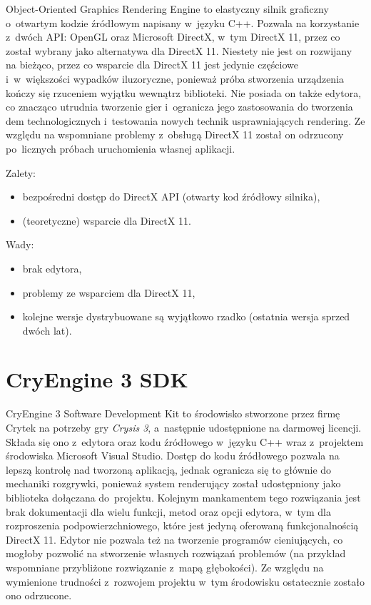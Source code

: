Object-Oriented Graphics Rendering Engine to elastyczny silnik graficzny o~otwartym kodzie źródłowym napisany w~języku C++. Pozwala na korzystanie z~dwóch API: OpenGL oraz Microsoft DirectX, w~tym DirectX 11, przez co został wybrany jako alternatywa dla DirectX 11. Niestety nie jest on rozwijany na bieżąco, przez co wsparcie dla DirectX 11 jest jedynie częściowe i~w~większości wypadków iluzoryczne, ponieważ próba stworzenia urządzenia kończy się rzuceniem wyjątku wewnątrz biblioteki. Nie posiada on także edytora, co znacząco utrudnia tworzenie gier i~ogranicza jego zastosowania do tworzenia dem technologicznych i~testowania nowych technik usprawniających rendering. Ze względu na wspomniane problemy z~obsługą DirectX 11 został on odrzucony po~licznych próbach uruchomienia własnej aplikacji.\\

{\raggedright Zalety:
\begin{itemize}
\item bezpośredni dostęp do DirectX API (otwarty kod źródłowy silnika),
\item (teoretyczne) wsparcie dla DirectX 11.
\end{itemize}

Wady:
\begin{itemize}
\item brak edytora,
\item problemy ze wsparciem dla DirectX 11,
\item kolejne wersje dystrybuowane są wyjątkowo rzadko (ostatnia wersja sprzed dwóch lat).
\end{itemize}
}
\section{CryEngine 3 SDK}

CryEngine 3 Software Development Kit to środowisko stworzone przez firmę Crytek na potrzeby gry \emph{Crysis 3}, a~następnie udostępnione na darmowej licencji. Składa się ono z~edytora oraz kodu źródłowego w~języku C++ wraz z~projektem środowiska Microsoft Visual Studio. Dostęp do kodu źródłowego pozwala na lepszą kontrolę nad tworzoną aplikacją, jednak ogranicza się to głównie do mechaniki rozgrywki, ponieważ system renderujący został udostępniony jako biblioteka dołączana do~projektu. Kolejnym mankamentem tego rozwiązania jest brak dokumentacji dla wielu funkcji, metod oraz opcji edytora, w~tym dla rozproszenia podpowierzchniowego, które jest jedyną oferowaną funkcjonalnością DirectX 11. Edytor nie pozwala też na tworzenie programów cieniujących, co mogłoby pozwolić na stworzenie własnych rozwiązań problemów (na przykład wspomniane przybliżone rozwiązanie z~mapą głębokości). Ze względu na wymienione trudności z~rozwojem projektu w~tym środowisku ostatecznie zostało ono odrzucone.\\

